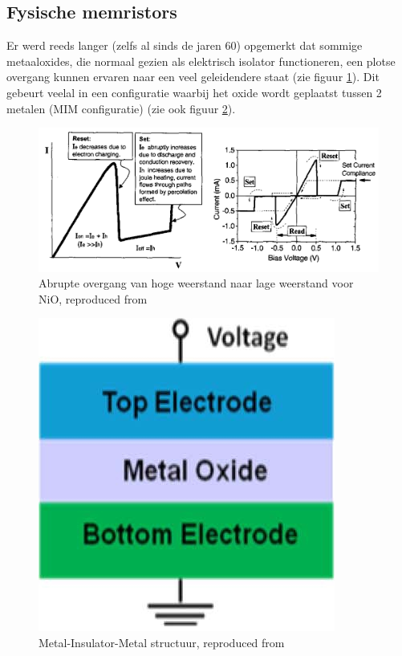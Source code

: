 \subsection{Fysische memristors}
Er werd reeds langer (zelfs al sinds de jaren 60) opgemerkt dat sommige metaaloxides, die normaal gezien als elektrisch isolator functioneren, een plotse overgang kunnen ervaren naar een veel geleidendere staat (zie figuur \ref{fig:i-v}). Dit gebeurt veelal in een configuratie waarbij het oxide wordt geplaatst tussen 2 metalen (MIM configuratie)\cite{Won12} (zie ook figuur \ref{fig:mim}).

\begin{figure}
  \centering
  \includegraphics[scale=0.25]{../fig/hfdstk-cel-I-V.png}
  \caption[Resistieve schakeling]{Abrupte overgang van hoge weerstand naar lage weerstand voor NiO, reproduced from\cite{Bae04}}
  \label{fig:i-v}
\end{figure}

\begin{figure}
  \centering
  \includegraphics[scale=0.4]{../fig/hfdstk-cel-MIM.png}
  \caption[MIM structuur]{Metal-Insulator-Metal structuur, reproduced from\cite{Won12}}
  \label{fig:mim}
\end{figure}

